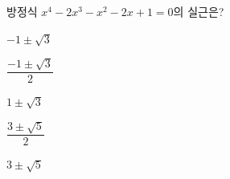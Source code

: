 방정식 $x^4-2x^3-x^2-2x+1=0$의 실근은?
\begin{choices32}{\rule[-3ex]{0pt}{8ex}$-1\pm\sqrt{3}$}{\rule[-3ex]{0pt}{8ex}$\dfrac{-1\pm\sqrt{3}}{2}$}{\rule[-3ex]{0pt}{8ex}$1\pm\sqrt{3}$}{\rule[-3ex]{0pt}{8ex}$\dfrac{3\pm\sqrt{5}}{2}$}{\rule[-3ex]{0pt}{8ex}$3\pm\sqrt{5}$}\end{choices32}
